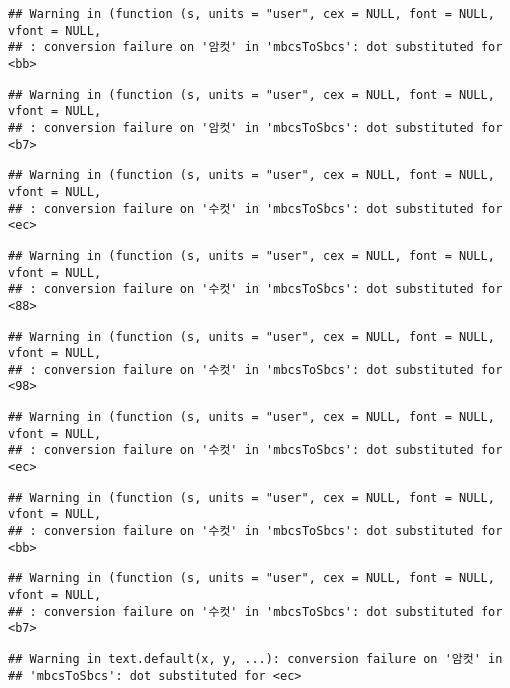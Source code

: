 \documentclass[
]{article}
\begin{document}
\begin{verbatim}
## Warning in (function (s, units = "user", cex = NULL, font = NULL, vfont = NULL,
## : conversion failure on '암컷' in 'mbcsToSbcs': dot substituted for <bb>
\end{verbatim}

\begin{verbatim}
## Warning in (function (s, units = "user", cex = NULL, font = NULL, vfont = NULL,
## : conversion failure on '암컷' in 'mbcsToSbcs': dot substituted for <b7>
\end{verbatim}

\begin{verbatim}
## Warning in (function (s, units = "user", cex = NULL, font = NULL, vfont = NULL,
## : conversion failure on '수컷' in 'mbcsToSbcs': dot substituted for <ec>
\end{verbatim}

\begin{verbatim}
## Warning in (function (s, units = "user", cex = NULL, font = NULL, vfont = NULL,
## : conversion failure on '수컷' in 'mbcsToSbcs': dot substituted for <88>
\end{verbatim}

\begin{verbatim}
## Warning in (function (s, units = "user", cex = NULL, font = NULL, vfont = NULL,
## : conversion failure on '수컷' in 'mbcsToSbcs': dot substituted for <98>
\end{verbatim}

\begin{verbatim}
## Warning in (function (s, units = "user", cex = NULL, font = NULL, vfont = NULL,
## : conversion failure on '수컷' in 'mbcsToSbcs': dot substituted for <ec>
\end{verbatim}

\begin{verbatim}
## Warning in (function (s, units = "user", cex = NULL, font = NULL, vfont = NULL,
## : conversion failure on '수컷' in 'mbcsToSbcs': dot substituted for <bb>
\end{verbatim}

\begin{verbatim}
## Warning in (function (s, units = "user", cex = NULL, font = NULL, vfont = NULL,
## : conversion failure on '수컷' in 'mbcsToSbcs': dot substituted for <b7>
\end{verbatim}

\begin{verbatim}
## Warning in text.default(x, y, ...): conversion failure on '암컷' in
## 'mbcsToSbcs': dot substituted for <ec>
\end{verbatim}
\end{document}
